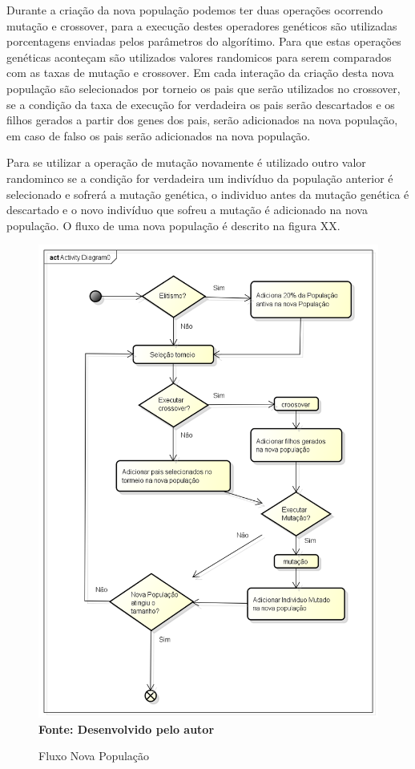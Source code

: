\documentclass{abntpuc}
\begin{document}
Durante a criação da nova população podemos ter duas operações ocorrendo mutação e crossover, para a execução destes operadores genéticos são utilizadas porcentagens enviadas pelos parâmetros do algorítimo. Para que estas operações genéticas aconteçam são utilizados valores randomicos para serem comparados com as taxas de mutação e crossover. Em cada interação da criação desta nova população são selecionados por torneio os pais que serão utilizados no crossover, se a condição da taxa de execução for verdadeira os pais serão descartados e os filhos gerados a partir dos genes dos pais, serão adicionados na nova população, em caso de falso os pais serão adicionados na nova população.\par
Para se utilizar a operação de mutação novamente é utilizado outro valor randominco se a condição for verdadeira um indivíduo da população anterior é selecionado e sofrerá a mutação genética, o individuo antes da mutação genética é descartado e o novo indivíduo que sofreu a mutação é adicionado na nova população. O fluxo de uma nova população é descrito na figura XX.\par

\begin{figure}[!htb]
\caption[Fluxo Nova População]{Fluxo Nova População}
\label{fig:figura8}
\centering
\includegraphics[scale=0.7]{imagens/fluxoNovaPopulacao.png}
\\ \textbf{\footnotesize Fonte: Desenvolvido pelo autor}
\end{figure}
\end{document}
